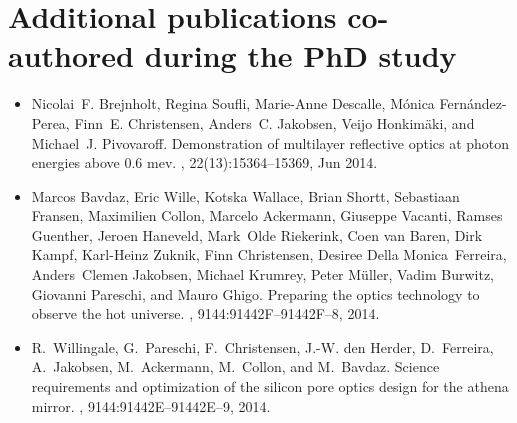 \section*{Additional publications co-authored during the PhD study}

%
%
%
\begin{itemize}

\item
Nicolai~F. Brejnholt, Regina Soufli, Marie-Anne Descalle, M\'{o}nica
  Fern\'{a}ndez-Perea, Finn~E. Christensen, Anders~C. Jakobsen, Veijo
  Honkim\"{a}ki, and Michael~J. Pivovaroff.
\newblock Demonstration of multilayer reflective optics at photon energies
  above 0.6 mev.
, 22(13):15364--15369, Jun 2014.

\item
Marcos Bavdaz, Eric Wille, Kotska Wallace, Brian Shortt, Sebastiaan Fransen,
  Maximilien Collon, Marcelo Ackermann, Giuseppe Vacanti, Ramses Guenther,
  Jeroen Haneveld, Mark~Olde Riekerink, Coen van Baren, Dirk Kampf, Karl-Heinz
  Zuknik, Finn Christensen, Desiree Della Monica~Ferreira, Anders~Clemen
  Jakobsen, Michael Krumrey, Peter M\"{u}ller, Vadim Burwitz, Giovanni
  Pareschi, and Mauro Ghigo.
\newblock Preparing the optics technology to observe the hot universe.
, 9144:91442F--91442F--8, 2014.

\item
R.~Willingale, G.~Pareschi, F.~Christensen, J.-W. den Herder, D.~Ferreira,
  A.~Jakobsen, M.~Ackermann, M.~Collon, and M.~Bavdaz.
\newblock Science requirements and optimization of the silicon pore optics
  design for the athena mirror.
, 9144:91442E--91442E--9, 2014.


\end{itemize}
